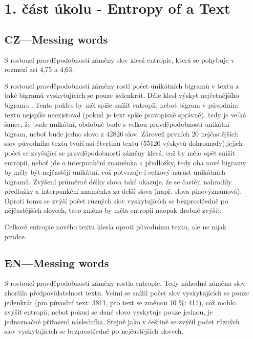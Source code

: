 \documentclass[12pt, a4paper]{report}
\theoremstyle{remark}
\begin{document}
\section*{1. část úkolu - Entropy of a Text}

\noindent


\subsection*{CZ---Messing words}
S rostoucí pravděpodobností záměny slov klesá entropie, která se pohybuje v rozmezí asi 4,75 a 4,63. 

S rostoucí pravděpodobností záměny rostl počet unikátních bigramů v textu a také bigramů vyskytujících se pouze jedenkrát.
Dále klesl výskyt nejčetnějšího bigramu . Tento pokles by měl spíše snížit entropii, neboť bigram  v původním textu nejspíše neexistoval (pokud je text spíše pravopisně správně), tedy je velká šance, že bude unikátní, obdobně  bude s velkou pravděpodobností unikátní bigram, neboť  bude jedno slovo z  42826 slov. Zároveň prvních 20 nejčastějších slov původního textu tvoří asi čtvrtinu textu (55120 výskytů dohromady),jejich počet se zvyšující se pravděpodobností záměny klesá, což by mělo opět snížit entropii, neboť jde o interpunkční znaménka a předložky, tedy oba nové bigramy by měly být nejčastěji unikátní, což potvrzuje i celkový nárůst unikátních bigramů. Zvýšení průměrné délky slova také ukazuje, že se častěji nahradily předložky a interpunkční znaménka za delší slova (např. slova plnovýznamová).
Oproti tomu se zvýší počet různých slov vyskytujících se bezprostředně po nějčastějších slovech, tato změna by měla entropii naopak drobně zvýšit. 

Celkově entropie nového textu klesla oproti původnímu textu, ale ne nijak prudce.



\subsection*{EN---Messing words}
S rostoucí pravděpodobností záměny rostla entropie. Tedy náhodná záměna slov zhoršila předpovídatelnost textu. Velmi se snížil počet slov vyskytujících se pouze jedenkrát (pro původní text: 3811, pro text se změnou 10 \%: 417), což mohlo zvýšit entropii, neboť pokud se dané slovo vyskytuje pouze jednou, je jednoznačné přiřazení následníka. Stejně jako v češtině se zvýšil počet různých slov vyskytujících se bezprostředně po nejčastějších slovech.
\end{document}
